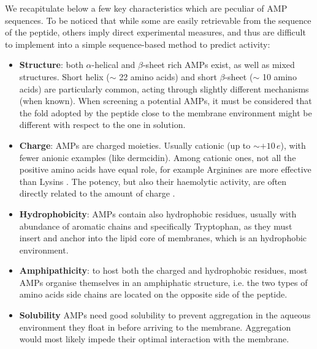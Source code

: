 We recapitulate below a few key characteristics which are peculiar of AMP sequences. To be noticed that while some are easily retrievable from the sequence of the peptide, others imply direct experimental measures, and thus are difficult to implement into a simple sequence-based method to predict activity:
\begin{itemize}
\item \textbf{Structure}: both $\alpha$-helical and $\beta$-sheet rich AMPs exist, as well as mixed structures. Short helix ($\sim$ 22 amino acids) and short $\beta$-sheet ($\sim$ 10 amino acids) are particularly common, acting through slightly different mechanisms (when known). When screening a potential AMPs, it must be considered that the fold adopted by the peptide close to the membrane environment might be different with respect to the one in solution.
%
\item \textbf{Charge}: AMPs are charged moieties. Usually cationic (up to $\sim + 10\,e$), with fewer anionic examples (like dermcidin). Among cationic ones, not all the positive amino acids have equal role, for example Arginines are more effective than Lysins \cite{Chan2006}. The potency, but also their haemolytic activity, are often directly related to the amount of charge \cite{???}.
%
\item \textbf{Hydrophobicity}: AMPs contain also hydrophobic residues, usually with abundance of aromatic chains and specifically Tryptophan, as they must insert and anchor into the lipid core of membranes, which is an hydrophobic environment.
%
\item \textbf{Amphipathicity}: to host both the charged and hydrophobic residues, most AMPs organise themselves in an amphiphatic structure, i.e. the two types of amino acids side chains are located on the opposite side of the peptide.
%
\item \textbf{Solubility} AMPs need good solubility to prevent aggregation in the aqueous environment they float in before arriving to the membrane. Aggregation would most likely impede their optimal interaction with the membrane.
\end{itemize}

